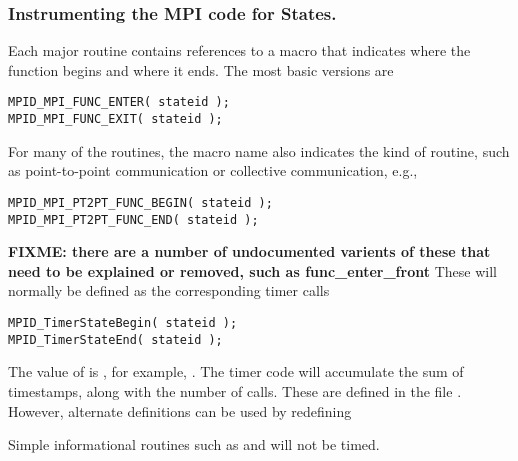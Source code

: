 \documentclass{article}
\def\fixme#1{\marginpar{FIXME:}\textbf{FIXME: #1}}
\begin{document}
\subsubsection{Instrumenting the MPI code for States.}
Each major routine contains references to a macro that indicates where
the function begins and where it ends.  The most basic versions are
\begin{verbatim}
MPID_MPI_FUNC_ENTER( stateid );
MPID_MPI_FUNC_EXIT( stateid );
\end{verbatim}
For many of the routines, the macro name also indicates the kind of
routine, such as point-to-point communication or collective
communication, e.g.,
\begin{verbatim}
MPID_MPI_PT2PT_FUNC_BEGIN( stateid );
MPID_MPI_PT2PT_FUNC_END( stateid );
\end{verbatim}
\fixme{there are a number of undocumented varients of these that need
  to be explained or removed, such as func\_enter\_front}
These will normally be defined as the corresponding timer calls
\begin{verbatim}
MPID_TimerStateBegin( stateid );
MPID_TimerStateEnd( stateid );
\end{verbatim}
The value of  is , for example,
.  The timer code will accumulate the sum of
timestamps, along with the number of calls.  These are defined in the file
.  However, alternate definitions can be
used by redefining

Simple informational routines such as  and
 will not be timed.


\end{document}
